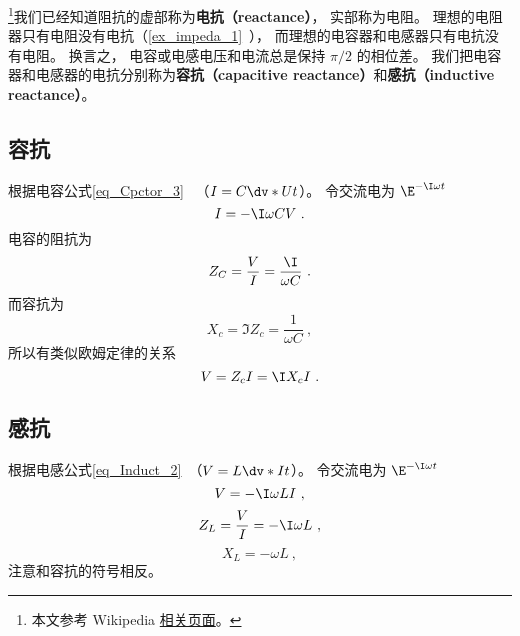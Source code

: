 

\footnote{本文参考 Wikipedia \href{https://en.wikipedia.org/wiki/Electrical_reactance}{相关页面}。}我们已经知道阻抗的虚部称为\textbf{电抗（reactance）}， 实部称为电阻。 理想的电阻器只有电阻没有电抗（\autoref{ex_impeda_1}~）， 而理想的电容器和电感器只有电抗没有电阻。 换言之， 电容或电感电压和电流总是保持 $\pi/2$ 的相位差。 我们把电容器和电感器的电抗分别称为\textbf{容抗（capacitive reactance）}和\textbf{感抗（inductive reactance）}。

\subsection{容抗}
根据电容公式\autoref{eq_Cpctor_3}~ （$I = C\dv*{U}{t}$）。 令交流电为 $\E^{-\I \omega t}$
\begin{equation}
I = -\I \omega CV~.
\end{equation}
电容的阻抗为
\begin{equation}
Z_C = \frac{V}{I} = \frac{\I}{\omega C}~.
\end{equation}
而容抗为
\begin{equation}
X_c = \Im{Z_c} = \frac{1}{\omega C}~,
\end{equation}
所以有类似欧姆定律的关系
\begin{equation}
V = Z_c I = \I X_c I~.
\end{equation}

\subsection{感抗}
根据电感公式\autoref{eq_Induct_2}~（$V = L\dv*{I}{t}$）。 令交流电为 $\E^{-\I \omega t}$
\begin{equation}
V = -\I\omega L I~,
\end{equation}
\begin{equation}
Z_L = \frac{V}{I} = -\I\omega L~,
\end{equation}
\begin{equation}
X_L = -\omega L~,
\end{equation}
注意和容抗的符号相反。
